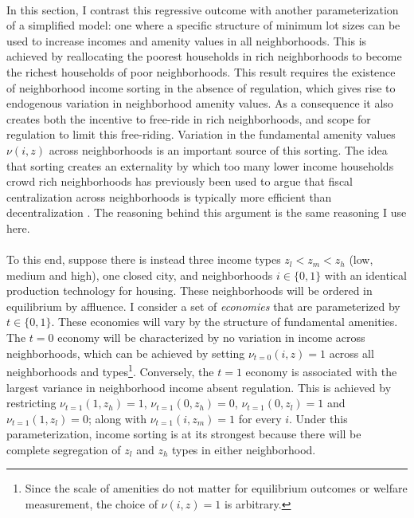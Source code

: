 \documentclass[12pt]{article}
\begin{document}
\paragraph*{}
In this section, I contrast this regressive outcome with another parameterization of a simplified model: one where a specific structure of minimum lot sizes can be used to increase incomes and amenity values in all neighborhoods. This is achieved by reallocating the poorest households in rich neighborhoods to become the richest households of poor neighborhoods. This result requires the existence of neighborhood income sorting in the absence of regulation, which gives rise to endogenous variation in neighborhood amenity values. As a consequence it also creates both the incentive to free-ride in rich neighborhoods, and scope for regulation to limit this free-riding. Variation in the fundamental amenity values $\nu(i, z)$ across neighborhoods is an important source of this sorting. The idea that sorting creates an externality by which too many lower income households crowd rich neighborhoods has previously been used to argue that fiscal centralization across neighborhoods is typically more efficient than decentralization \citep{ineffTiebout, calabresetal}. The reasoning behind this argument is the same reasoning I use here.

\paragraph*{}
To this end, suppose there is instead three income types $z_{l} < z_{m} < z_{h}$ (low, medium and high), one closed city, and neighborhoods $i \in \{0, 1\}$ with an identical production technology for housing. These neighborhoods will be ordered in equilibrium by affluence. I consider a set of \textit{economies} that are parameterized by $t \in \{0, 1\}$. These economies will vary by the structure of fundamental amenities. The $t = 0$ economy will be characterized by no variation in income across neighborhoods, which can be achieved by setting $\nu_{t = 0}(i, z) = 1$ across all neighborhoods and types\footnote{Since the scale of amenities do not matter for equilibrium outcomes or welfare measurement, the choice of $\nu(i, z) = 1$ is arbitrary.}. Conversely, the $t = 1$ economy is associated with the largest variance in neighborhood income absent regulation. This is achieved by restricting $\nu_{t = 1}(1, z_{h}) = 1$, $\nu_{t = 1}(0, z_{h}) = 0$, $\nu_{t = 1}(0, z_{l}) = 1$ and $\nu_{t = 1}(1, z_{l}) = 0$; along with $\nu_{t = 1}(i, z_{m}) = 1$ for every $i$. Under this parameterization, income sorting is at its strongest because there will be complete segregation of $z_{l}$ and $z_{h}$ types in either neighborhood.  
\end{document}
